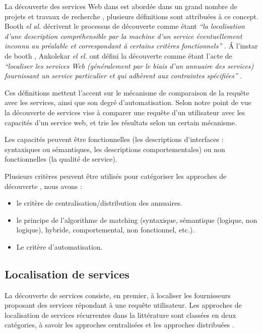 La découverte des services Web dans est abordée dans un grand nombre
de projets et travaux de recherche \cite{elie2010}, plusieurs
définitions sont attribuées à ce concept. Booth \textit{el al.}
décrivent le processus de découverte comme étant \textit{``la
  localisation d'une description compréhensible par la machine d'un
  service éventuellement inconnu au préalable et correspondant à
  certains critères fonctionnels''} \cite{booth2004web}. Á l'instar de
booth \cite{booth2004web}, Ankolekar \textit{el el.} ont défini la
découverte comme étant l'acte de \textit{``localiser les services Web
  (généralement par le biais d'un annuaire des services) fournissant
  un service particulier et qui adhèrent aux contraintes spécifiées''}
\cite{ankolekar2002daml}.

Ces définitions mettent l'accent sur le mécanisme de comparaison de la
requête avec les services, ainsi que son degré d'automatisation. Selon
notre point de vue la découverte de services vise à comparer une
requête d'un utilisateur avec les capacités d'un service web, et trie
les résultats selon un certain mécanisme.

Les capacités peuvent être fonctionnelles (les descriptions
d'interfaces : syntaxiques ou sémantiques, les descriptions
comportementales) ou non fonctionnelles (la qualité de service).

Plusieurs critères peuvent être utilisés pour catégoriser les
approches de découverte \cite{elie2010}, nous avons :

\begin{itemize}
\item le critère de centralisation/distribution des annuaires.
\item le principe de l'algorithme de matching (syntaxique, sémantique
  (logique, non logique), hybride, comportemental, non fonctionnel, etc.).
\item Le critère d'automatisation.
\end{itemize}

  \subsection{Localisation de services}
  \label{sec:ws-localisation}

  La découverte de services consiste, en premier, à localiser les
  fournisseurs proposant des services répondant à une requête
  utilisateur. Les approches de localisation de services récurrentes
  dans la littérature sont classées en deux catégories, à savoir les
  approches centralisées et les approches distribuées \cite{elie2010}.


